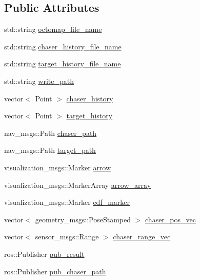 \subsection*{Public Attributes}
\begin{DoxyCompactItemize}
\item 
std\+::string \hyperlink{class_anal_server_a362fcfd026bb7bd84404b66d2adee477}{octomap\+\_\+file\+\_\+name}
\item 
std\+::string \hyperlink{class_anal_server_ab916cca9794227a265d411fecadd7110}{chaser\+\_\+history\+\_\+file\+\_\+name}
\item 
std\+::string \hyperlink{class_anal_server_a8c43abe17071a7efb0859f21ed783b85}{target\+\_\+history\+\_\+file\+\_\+name}
\item 
std\+::string \hyperlink{class_anal_server_ad16405e56690aba4b2ff012c7219f146}{write\+\_\+path}
\item 
vector$<$ Point $>$ \hyperlink{class_anal_server_a0e5ae7020588fe8c8a56fef094a8da7c}{chaser\+\_\+history}
\item 
vector$<$ Point $>$ \hyperlink{class_anal_server_a1e7e665eb6e6d1ab8b81f1e632919a29}{target\+\_\+history}
\item 
nav\+\_\+msgs\+::\+Path \hyperlink{class_anal_server_a93990e437aae2dd4a8b9a320c88056e2}{chaser\+\_\+path}
\item 
nav\+\_\+msgs\+::\+Path \hyperlink{class_anal_server_a1d535244ef666b575e1d82fd70c20e03}{target\+\_\+path}
\item 
visualization\+\_\+msgs\+::\+Marker \hyperlink{class_anal_server_af86ac23277ff6b551817d7bdb11a8bd0}{arrow}
\item 
visualization\+\_\+msgs\+::\+Marker\+Array \hyperlink{class_anal_server_a2d15670b94e2cdb4c3e3657378ad3a8c}{arrow\+\_\+array}
\item 
visualization\+\_\+msgs\+::\+Marker \hyperlink{class_anal_server_a7c910a2fc912d3b317390f67d21312b1}{edf\+\_\+marker}
\item 
vector$<$ geometry\+\_\+msgs\+::\+Pose\+Stamped $>$ \hyperlink{class_anal_server_aa3d74bff2f9b08b78148ec2d6dbc0af4}{chaser\+\_\+pos\+\_\+vec}
\item 
vector$<$ sensor\+\_\+msgs\+::\+Range $>$ \hyperlink{class_anal_server_af1735aa99a3a1aa3e512ba6dd233a2b9}{chaser\+\_\+range\+\_\+vec}
\item 
ros\+::\+Publisher \hyperlink{class_anal_server_aca3157ed885fa6b5cebfd1c19e54f99b}{pub\+\_\+result}
\item 
ros\+::\+Publisher \hyperlink{class_anal_server_a7974a75afcd838b877386eed62750877}{pub\+\_\+chaser\+\_\+path}

\end{DoxyCompactItemize}
